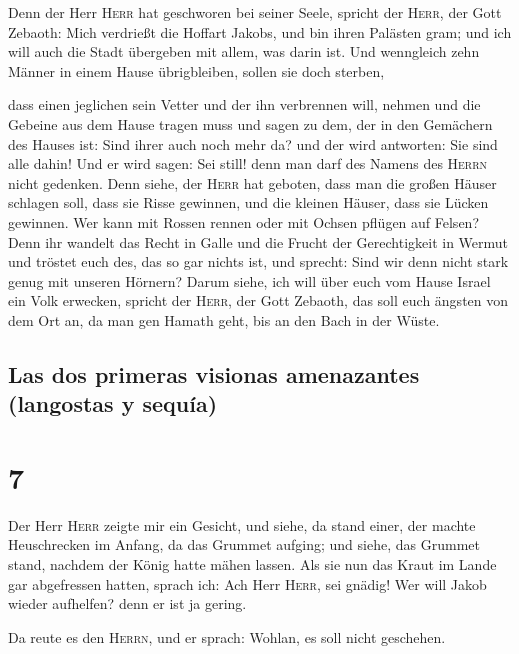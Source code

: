  Denn der Herr \textsc{Herr} hat geschworen bei seiner
Seele, spricht der \textsc{Herr}, der Gott Zebaoth: Mich verdrießt die
Hoffart Jakobs, und bin ihren Palästen gram; und ich will auch die Stadt
übergeben mit allem, was darin ist.  Und wenngleich zehn
Männer in einem Hause übrigbleiben, sollen sie doch sterben,

 dass einen jeglichen sein Vetter und der ihn verbrennen
will, nehmen und die Gebeine aus dem Hause tragen muss und sagen zu dem,
der in den Gemächern des Hauses ist: Sind ihrer auch noch mehr da? und
der wird antworten: Sie sind alle dahin! Und er wird sagen: Sei still!
denn man darf des Namens des \textsc{Herrn} nicht gedenken.
 Denn siehe, der \textsc{Herr} hat geboten, dass man die
großen Häuser schlagen soll, dass sie Risse gewinnen, und die kleinen
Häuser, dass sie Lücken gewinnen.  Wer kann mit Rossen
rennen oder mit Ochsen pflügen auf Felsen? Denn ihr wandelt das Recht in
Galle und die Frucht der Gerechtigkeit in Wermut  und
tröstet euch des, das so gar nichts ist, und sprecht: Sind wir denn
nicht stark genug mit unseren Hörnern?  Darum siehe, ich
will über euch vom Hause Israel ein Volk erwecken, spricht der
\textsc{Herr}, der Gott Zebaoth, das soll euch ängsten von dem Ort an,
da man gen Hamath geht, bis an den Bach in der Wüste.

\hypertarget{las-dos-primeras-visionas-amenazantes-langostas-y-sequuxeda}{%
\subsection{Las dos primeras visionas amenazantes (langostas y
sequía)}\label{las-dos-primeras-visionas-amenazantes-langostas-y-sequuxeda}}

\hypertarget{section-6}{%
\section{7}\label{section-6}}

 Der Herr \textsc{Herr} zeigte mir ein Gesicht, und siehe,
da stand einer, der machte Heuschrecken im Anfang, da das Grummet
aufging; und siehe, das Grummet stand, nachdem der König hatte mähen
lassen.  Als sie nun das Kraut im Lande gar abgefressen
hatten, sprach ich: Ach Herr \textsc{Herr}, sei gnädig! Wer will Jakob
wieder aufhelfen? denn er ist ja gering.

 Da reute es den \textsc{Herrn}, und er sprach: Wohlan, es
soll nicht geschehen.

